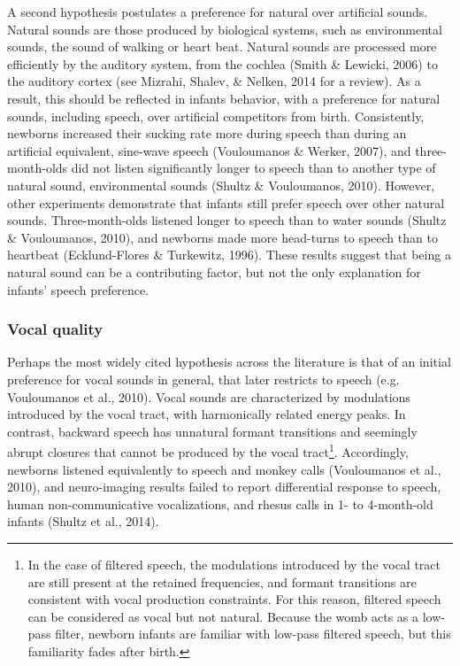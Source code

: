 \documentclass[man]{apa6}
\let\rmarkdownfootnote\footnote%
\def\footnote{\protect\rmarkdownfootnote}
\begin{document}
A second hypothesis postulates a preference for natural over artificial
sounds. Natural sounds are those produced by biological systems, such as
environmental sounds, the sound of walking or heart beat. Natural sounds
are processed more efficiently by the auditory system, from the cochlea
(Smith \& Lewicki, 2006) to the auditory cortex (see Mizrahi, Shalev, \&
Nelken, 2014 for a review). As a result, this should be reflected in
infants behavior, with a preference for natural sounds, including
speech, over artificial competitors from birth. Consistently, newborns
increased their sucking rate more during speech than during an
artificial equivalent, sine-wave speech (Vouloumanos \& Werker, 2007),
and three-month-olds did not listen significantly longer to speech than
to another type of natural sound, environmental sounds (Shultz \&
Vouloumanos, 2010). However, other experiments demonstrate that infants
still prefer speech over other natural sounds. Three-month-olds listened
longer to speech than to water sounds (Shultz \& Vouloumanos, 2010), and
newborns made more head-turns to speech than to heartbeat
(Ecklund-Flores \& Turkewitz, 1996). These results suggest that being a
natural sound can be a contributing factor, but not the only explanation
for infants' speech preference.

\subsubsection{Vocal quality}\label{vocal-quality}

Perhaps the most widely cited hypothesis across the literature is that
of an initial preference for vocal sounds in general, that later
restricts to speech (e.g. Vouloumanos et al., 2010). Vocal sounds are
characterized by modulations introduced by the vocal tract, with
harmonically related energy peaks. In contrast, backward speech has
unnatural formant transitions and seemingly abrupt closures that cannot
be produced by the vocal tract\footnote{In the case of filtered speech,
  the modulations introduced by the vocal tract are still present at the
  retained frequencies, and formant transitions are consistent with
  vocal production constraints. For this reason, filtered speech can be
  considered as vocal but not natural. Because the womb acts as a
  low-pass filter, newborn infants are familiar with low-pass filtered
  speech, but this familiarity fades after birth.}. Accordingly,
newborns listened equivalently to speech and monkey calls (Vouloumanos
et al., 2010), and neuro-imaging results failed to report differential
response to speech, human non-communicative vocalizations, and rhesus
calls in 1- to 4-month-old infants (Shultz et al., 2014).
\end{document}
